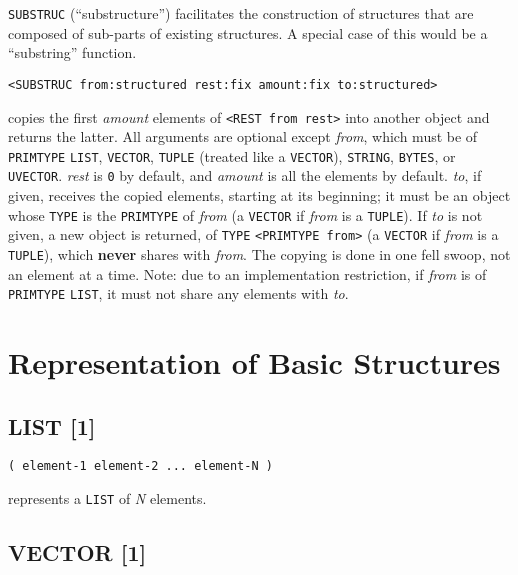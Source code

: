\documentclass[a4paper]{scrbook}
\begin{document}
 \texttt{SUBSTRUC} (``substructure'') facilitates the construction of structures that are
composed of sub-parts of existing structures. A special case of this would be a ``substring'' function.

\begin{verbatim}
<SUBSTRUC from:structured rest:fix amount:fix to:structured>
\end{verbatim}

copies the first \emph{amount} elements of \texttt{\textless{}REST\ from\ rest\textgreater{}} into another object and
returns the latter. All arguments are optional except \emph{from}, which must be of \texttt{PRIMTYPE} \texttt{LIST},
\texttt{VECTOR}, \texttt{TUPLE} (treated like a \texttt{VECTOR}), \texttt{STRING}, \texttt{BYTES}, or \texttt{UVECTOR}.
\emph{rest} is \texttt{0} by default, and \emph{amount} is all the elements by default. \emph{to}, if given, receives the
copied elements, starting at its beginning; it must be an object whose \texttt{TYPE} is the \texttt{PRIMTYPE} of
\emph{from} (a \texttt{VECTOR} if \emph{from} is a \texttt{TUPLE}). If \emph{to} is not given, a new object is returned, of
\texttt{TYPE} \texttt{\textless{}PRIMTYPE\ from\textgreater{}} (a \texttt{VECTOR} if \emph{from} is a \texttt{TUPLE}),
which \textbf{never} shares with \emph{from}. The copying is done in one fell swoop, not an element at a time. Note: due to
an implementation restriction, if \emph{from} is of \texttt{PRIMTYPE} \texttt{LIST}, it must not share any elements with
\emph{to}.

\section{Representation of Basic Structures}\label{representation-of-basic-structures}

\subsection{LIST {[}1{]}}\label{list-1}

\begin{verbatim}
( element-1 element-2 ... element-N )
\end{verbatim}

  represents a \texttt{LIST} of \emph{N}
elements.

\subsection{VECTOR {[}1{]}}\label{vector-1}
\end{document}
